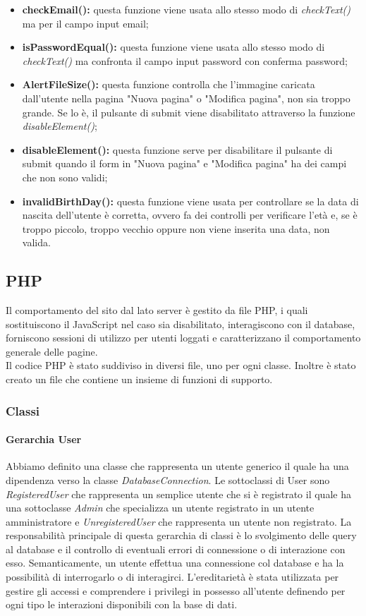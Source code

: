 \begin{itemize}
	\item \textbf{checkEmail():} questa funzione viene usata allo stesso modo di \textit{checkText()} ma per il campo input email;
	\item \textbf{isPasswordEqual():} questa funzione viene usata allo stesso modo di \textit{checkText()} ma confronta il campo input password con conferma password;
	\item \textbf{AlertFileSize():} questa funzione controlla che l'immagine caricata dall'utente nella pagina "Nuova pagina" o "Modifica pagina", non sia troppo grande. Se lo è, il pulsante di submit viene disabilitato attraverso la funzione \textit{disableElement()};
	\item \textbf{disableElement():} questa funzione serve per disabilitare il pulsante di submit quando il form in "Nuova pagina" e "Modifica pagina" ha dei campi che non sono validi;
	\item \textbf{invalidBirthDay():} questa funzione viene usata per controllare se la data di nascita dell'utente è corretta, ovvero fa dei controlli per verificare l'età e, se è troppo piccolo, troppo vecchio oppure non viene inserita una data, non valida.
	
\end{itemize}
\pagebreak
\subsection{PHP}
Il comportamento del sito dal lato server è gestito da file PHP, i quali sostituiscono il JavaScript nel caso sia disabilitato, interagiscono con il database, forniscono sessioni di utilizzo per utenti loggati e caratterizzano il comportamento generale delle pagine.\\
Il codice PHP è stato suddiviso in diversi file, uno per ogni classe. Inoltre è stato creato un file che contiene un insieme di funzioni di supporto.

\subsubsection{Classi}
\paragraph{Gerarchia User} Abbiamo definito una classe che rappresenta un utente generico il quale ha una dipendenza verso la classe \textit{DatabaseConnection}. Le sottoclassi di User sono \textit{RegisteredUser} che rappresenta un semplice utente che si è registrato il quale ha una sottoclasse \textit{Admin} che specializza un utente registrato in un utente amministratore e \textit{UnregisteredUser} che rappresenta un utente non registrato. La responsabilità principale di questa gerarchia di classi è lo svolgimento delle query al database e il controllo di eventuali errori di connessione o di interazione con esso. Semanticamente, un utente effettua una connessione col database e ha la possibilità di interrogarlo o di interagirci. L'ereditarietà è stata utilizzata per gestire gli accessi e comprendere i privilegi in possesso all'utente definendo per ogni tipo le interazioni disponibili con la base di dati.

